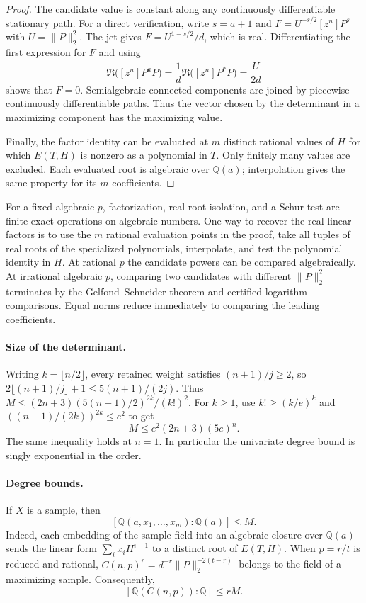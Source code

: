 \documentclass[11pt]{article}
\begin{document}
\begin{proof}
The candidate value is constant along any continuously
differentiable stationary path. For a direct verification, write
\(s=a+1\) and \(F=U^{-s/2}[z^n]P^s\) with \(U=\|P\|_2^2\).
The jet gives \(F=U^{1-s/2}/d\), which is real. Differentiating
the first expression for \(F\) and using
\[
 \Re\bigl([z^n]P^a\dot P\bigr)
   =\frac1d\Re\bigl([z^n]P^*\dot P\bigr)=\frac{\dot U}{2d}
\]
shows that \(\dot F=0\).
Semialgebraic connected components are joined by piecewise
continuously differentiable paths. Thus the vector chosen by the
determinant in a maximizing component has the maximizing value.

Finally, the factor identity can be evaluated at \(m\) distinct
rational values of \(H\) for which \(E(T,H)\) is nonzero as a
polynomial in \(T\). Only finitely many values are excluded.
Each evaluated root is algebraic over \(\mathbb Q(a)\); interpolation
gives the same property for its \(m\) coefficients.
\end{proof}

For a fixed algebraic \(p\), factorization, real-root isolation,
and a Schur test are finite exact operations on algebraic
numbers. One way to recover the real linear factors is to use
the \(m\) rational evaluation points in the proof, take all
tuples of real roots of the specialized polynomials, interpolate,
and test the polynomial identity in \(H\). At rational \(p\)
the candidate powers can be compared algebraically. At irrational
algebraic \(p\), comparing two candidates with different
\(\|P\|_2^2\) terminates by the Gelfond--Schneider theorem and
certified logarithm comparisons. Equal norms reduce immediately
to comparing the leading coefficients.

\paragraph{Size of the determinant.}
Writing \(k=\lfloor n/2\rfloor\), every retained weight satisfies
\((n+1)/j\geq2\), so
\(2\lfloor(n+1)/j\rfloor+1\leq 5(n+1)/(2j)\).
Thus \(M\leq(2n+3)(5(n+1)/2)^{2k}/(k!)^2\).
For \(k\geq1\), use \(k!\geq(k/e)^k\) and
\(((n+1)/(2k))^{2k}\leq e^2\) to get
\[
 M\leq e^2(2n+3)(5e)^n .
\]
The same inequality holds at \(n=1\). In particular the
univariate degree bound is singly exponential in the order.

\paragraph{Degree bounds.}
If \(X\) is a sample, then
\[
 [\mathbb Q(a,x_1,\ldots,x_m):\mathbb Q(a)]\leq M.
\]
Indeed, each embedding of the sample field into an algebraic
closure over \(\mathbb Q(a)\) sends the linear form
\(\sum_i x_iH^{i-1}\) to a distinct root of \(E(T,H)\).
When \(p=r/t\) is reduced and rational,
\(C(n,p)^r=d^{-r}\|P\|_2^{-2(t-r)}\) belongs to the field of
a maximizing sample. Consequently,
\[
 [\mathbb Q(C(n,p)):\mathbb Q]
       \leq rM.
\]
\end{document}
